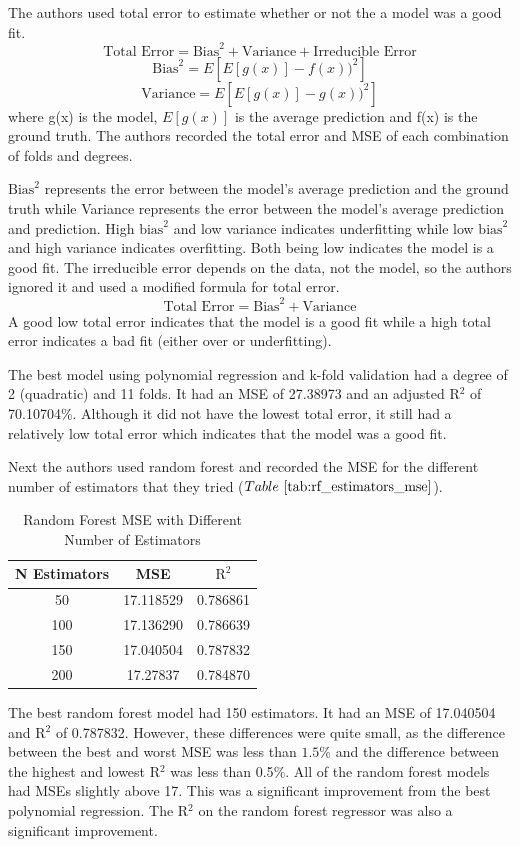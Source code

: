 \documentclass[conference, 11pt]{IEEEtran}
\begin{document}
The authors used total error to estimate whether or not the a model was a good fit.
\[
\text{Total Error} = \text{Bias}^2 + \text{Variance} + \text{Irreducible Error}
\]
\[
\text{Bias}^2 = E[E[g(x)] - f(x))^2]
\]
\[
\text{Variance} = E[E[g(x)] - g(x))^2]
\]
where g(x) is the model, $E[g(x)]$ is the average prediction and f(x) is the ground truth.
The authors recorded the total error and MSE of each combination of folds and degrees.

$\text{Bias}^2$ represents the error between the model's average prediction and the ground truth while Variance represents the error between the model's average prediction and prediction. High $\text{bias}^2$ and low variance indicates underfitting while low $\text{bias}^2$ and high variance indicates overfitting. Both being low indicates the model is a good fit. The irreducible error depends on the data, not the model, so the authors ignored it and used a modified formula for total error.
\[\text{Total Error} = \text{Bias}^2 + \text{Variance} \]
A good low total error indicates that the model is a good fit while a high total error indicates a bad fit (either over or underfitting).

The best model using polynomial regression and k-fold validation had a degree of 2 (quadratic) and 11 folds. It had an MSE of 27.38973 and an adjusted R$^2$ of 70.10704\%. Although it did not have the lowest total error, it still had a relatively low total error which indicates that the model was a good fit.

Next the authors used random forest and recorded the MSE for the different number of estimators that they tried ($Table~\ref{tab:rf_estimators_mse}$).

\begin{table}[h!]
    \centering
    \caption{Random Forest MSE with Different Number of Estimators}
    \begin{tabular}{|c|c|c|}
        \hline
        N Estimators & MSE & $\text{R}^2$ \\
        \hline
        50  & 17.118529 & 0.786861\\
        100 & 17.136290 & 0.786639\\
        150 & 17.040504 & 0.787832\\
        200 & 17.27837 & 0.784870\\
        \hline
    \end{tabular}
    \label{tab:rf_estimators_mse}
\end{table}

The best random forest model had 150 estimators. It had an MSE of 17.040504 and R$^2$ of 0.787832. However, these differences were quite small, as the difference between the best and worst MSE was less than $1.5\%$ and the difference between the highest and lowest R$^2$ was less than 0.5$\%$. All of the random forest models had MSEs slightly above 17. This was a significant improvement from the best polynomial regression. The R$^2$ on the random forest regressor was also a significant improvement.
\end{document}
